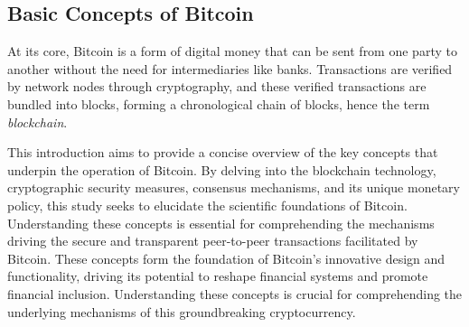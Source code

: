 \subsection{Basic Concepts of Bitcoin}
At its core, Bitcoin is a form of digital money that can be sent from one party to another without the need for intermediaries like banks. Transactions are verified by network nodes through cryptography, and these verified transactions are bundled into blocks, forming a chronological chain of blocks, hence the term \textit{blockchain}.

This introduction aims to provide a concise overview of the key concepts that underpin the operation of Bitcoin. By delving into the blockchain technology, cryptographic security measures, consensus mechanisms, and its unique monetary policy, this study seeks to elucidate the scientific foundations of Bitcoin. Understanding these concepts is essential for comprehending the mechanisms driving the secure and transparent peer-to-peer transactions facilitated by Bitcoin. These concepts form the foundation of Bitcoin's innovative design and functionality, driving its potential to reshape financial systems and promote financial inclusion. Understanding these concepts is crucial for comprehending the underlying mechanisms of this groundbreaking cryptocurrency.

